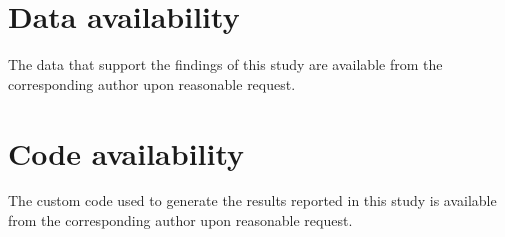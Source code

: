 \documentclass[pdflatex,sn-mathphys-num]{sn-jnl}%
\begin{document}
\section*{Data availability}
The data that support the findings of this study are available from the corresponding author upon reasonable request.

\section*{Code availability}
The custom code used to generate the results reported in this study is available from the corresponding author upon reasonable request.


\clearpage
\setcounter{figure}{0}
\renewcommand{\figurename}{Extended Data Figure}
\renewcommand{\theHfigure}{ED\arabic{figure}}
\end{document}
